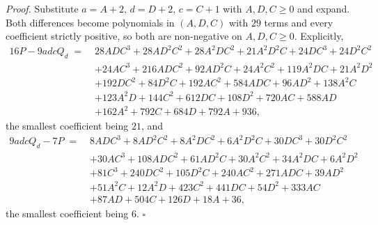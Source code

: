 \documentclass[12pt, a4paper]{article}
\newcommand{\qed}{\hfill$\square$}
\newenvironment{proof}[1][Proof]{\par\noindent\textit{#1.}\space}{\qed\par\medskip}
\begin{document}
\begin{proof}
Substitute $a = A+2$, $d = D+2$, $c = C+1$ with $A, D, C \ge 0$ and expand. Both differences become polynomials in $(A,D,C)$ with $29$ terms and every coefficient strictly positive, so both are non-negative on $A,D,C \ge 0$. Explicitly,
\begin{align*}
16P - 9adcQ_d \;=\;& 28ADC^3 + 28AD^2C^2 + 28A^2DC^2 + 21A^2D^2C + 24DC^3 + 24D^2C^2 \\
&+ 24AC^3 + 216ADC^2 + 92AD^2C + 24A^2C^2 + 119A^2DC + 21A^2D^2 \\
&+ 192DC^2 + 84D^2C + 192AC^2 + 584ADC + 96AD^2 + 138A^2C \\
&+ 123A^2D + 144C^2 + 612DC + 108D^2 + 720AC + 588AD \\
&+ 162A^2 + 792C + 684D + 792A + 936 ,
\end{align*}
the smallest coefficient being $21$, and
\begin{align*}
9adcQ_d - 7P \;=\;& 8ADC^3 + 8AD^2C^2 + 8A^2DC^2 + 6A^2D^2C + 30DC^3 + 30D^2C^2 \\
&+ 30AC^3 + 108ADC^2 + 61AD^2C + 30A^2C^2 + 34A^2DC + 6A^2D^2 \\
&+ 81C^3 + 240DC^2 + 105D^2C + 240AC^2 + 271ADC + 39AD^2 \\
&+ 51A^2C + 12A^2D + 423C^2 + 441DC + 54D^2 + 333AC \\
&+ 87AD + 504C + 126D + 18A + 36 ,
\end{align*}
the smallest coefficient being $6$.
\end{proof}
\end{document}
